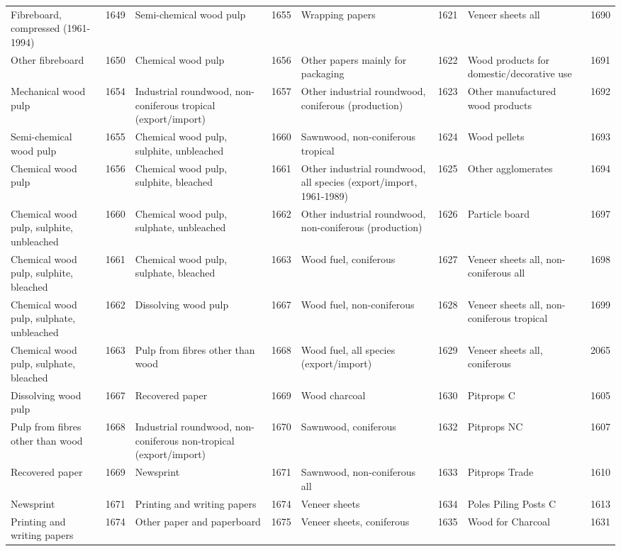 \documentclass[
]{book}
\begin{document}
\begin{table}
\begin{tabular}[t]{lrlrlrlr}
Fibreboard, compressed (1961-1994) & 1649 & Semi-chemical wood pulp & 1655 & Wrapping papers & 1621 & Veneer sheets all & 1690\\
Other fibreboard & 1650 & Chemical wood pulp & 1656 & Other papers mainly for packaging & 1622 & Wood products for domestic/decorative use & 1691\\
Mechanical wood pulp & 1654 & Industrial roundwood, non-coniferous tropical (export/import) & 1657 & Other industrial roundwood, coniferous (production) & 1623 & Other manufactured wood products & 1692\\
Semi-chemical wood pulp & 1655 & Chemical wood pulp, sulphite, unbleached & 1660 & Sawnwood, non-coniferous tropical & 1624 & Wood pellets & 1693\\
\addlinespace
Chemical wood pulp & 1656 & Chemical wood pulp, sulphite, bleached & 1661 & Other industrial roundwood, all species (export/import, 1961-1989) & 1625 & Other agglomerates & 1694\\
Chemical wood pulp, sulphite, unbleached & 1660 & Chemical wood pulp, sulphate, unbleached & 1662 & Other industrial roundwood, non-coniferous (production) & 1626 & Particle board & 1697\\
Chemical wood pulp, sulphite, bleached & 1661 & Chemical wood pulp, sulphate, bleached & 1663 & Wood fuel, coniferous & 1627 & Veneer sheets all, non-coniferous all & 1698\\
Chemical wood pulp, sulphate, unbleached & 1662 & Dissolving wood pulp & 1667 & Wood fuel, non-coniferous & 1628 & Veneer sheets all, non-coniferous tropical & 1699\\
Chemical wood pulp, sulphate, bleached & 1663 & Pulp from fibres other than wood & 1668 & Wood fuel, all species (export/import) & 1629 & Veneer sheets all, coniferous & 2065\\
\addlinespace
Dissolving wood pulp & 1667 & Recovered paper & 1669 & Wood charcoal & 1630 & Pitprops C & 1605\\
Pulp from fibres other than wood & 1668 & Industrial roundwood, non-coniferous non-tropical (export/import) & 1670 & Sawnwood, coniferous & 1632 & Pitprops NC & 1607\\
Recovered paper & 1669 & Newsprint & 1671 & Sawnwood, non-coniferous all & 1633 & Pitprops Trade & 1610\\
Newsprint & 1671 & Printing and writing papers & 1674 & Veneer sheets & 1634 & Poles Piling Posts C & 1613\\
Printing and writing papers & 1674 & Other paper and paperboard & 1675 & Veneer sheets, coniferous & 1635 & Wood for Charcoal & 1631\\

\end{tabular}
\end{table}
\end{document}
